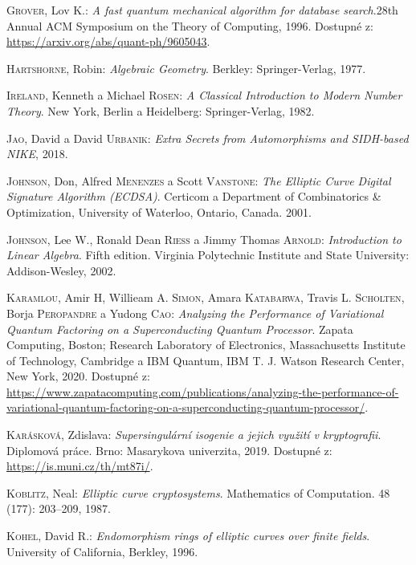 \documentclass[12pt]{report}
\begin{document}
\begin{thebibliography}{97}
\textsc{Grover}, Lov K.: \textit{A fast quantum mechanical algorithm for database search}.28th Annual ACM Symposium on the Theory of Computing, 1996. Dostupné z: \url{https://arxiv.org/abs/quant-ph/9605043}.

\textsc{Hartshorne}, Robin: \textit{Algebraic  Geometry}. Berkley: Springer-Verlag, 1977.

\textsc{Ireland}, Kenneth a Michael \textsc{Rosen}: \textit{A Classical Introduction to Modern Number Theory}. New York, Berlin a Heidelberg: Springer-Verlag, 1982.

\textsc{Jao}, David a David \textsc{Urbanik}: \textit{Extra Secrets from Automorphisms and SIDH-based NIKE}, 2018.

\textsc{Johnson}, Don, Alfred \textsc{Menenzes} a Scott \textsc{Vanstone}: \textit{The Elliptic Curve Digital Signature Algorithm (ECDSA)}. Certicom a Department of Combinatorics \& Optimization, University of Waterloo,  Ontario, Canada. 2001.

\textsc{Johnson}, Lee W., Ronald Dean \textsc{Riess} a Jimmy Thomas \textsc{Arnold}: \textit{Introduction to Linear Algebra}. Fifth edition. Virginia Polytechnic Institute and State University: Addison-Wesley, 2002.

\textsc{Karamlou}, Amir H, Willieam A. \textsc{Simon}, Amara \textsc{Katabarwa}, Travis L. \textsc{Scholten}, Borja \textsc{Peropandre} a Yudong \textsc{Cao}: \textit{Analyzing the Performance of Variational Quantum Factoring on a Superconducting Quantum Processor}. Zapata Computing, Boston; Research Laboratory of Electronics, Massachusetts Institute of Technology, Cambridge a IBM Quantum, IBM T. J. Watson Research Center, New York, 2020. Dostupné z: \url{https://www.zapatacomputing.com/publications/analyzing-the-performance-of-variational-quantum-factoring-on-a-superconducting-quantum-processor/}.

\textsc{Karásková}, Zdislava: \textit{Supersingulární isogenie a jejich využití v kryptografii}. Diplomová práce. Brno: Masarykova univerzita, 2019. Dostupné z: \url{https://is.muni.cz/th/mt87i/}.

\textsc{Koblitz}, Neal: \textit{Elliptic curve cryptosystems}. Mathematics of Computation. 48 (177): 203–209, 1987.

\textsc{Kohel}, David R.: \textit{Endomorphism rings of elliptic curves over finite fields}. University of California, Berkley, 1996.


\end{thebibliography}
\end{document}
